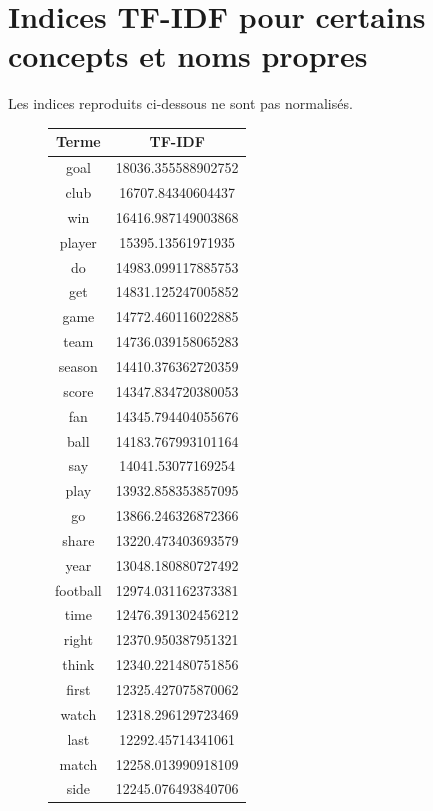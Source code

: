 \documentclass[a4paper, 12pt]{article}
\begin{document}
\nocite{*}
\printbibliography{}

\newpage
\appendix

\section{Indices TF-IDF pour certains concepts et noms propres}

Les indices reproduits ci-dessous ne sont pas normalisés.

\begin{figure}[!h]
\begin{center}
 \begin{tabular}{|c|c|}
 \hline
  \textbf{Terme} & \textbf{TF-IDF} \\
  \hline
  goal & 18036.355588902752 \\
  club & 16707.84340604437 \\
  win & 16416.987149003868 \\
  player & 15395.13561971935 \\
  do & 14983.099117885753 \\
  get & 14831.125247005852 \\
  game & 14772.460116022885 \\
  team & 14736.039158065283 \\
  season & 14410.376362720359 \\
  score & 14347.834720380053 \\
  fan & 14345.794404055676 \\
  ball & 14183.767993101164 \\
  say & 14041.53077169254 \\
  play & 13932.858353857095 \\
  go & 13866.246326872366 \\
  share & 13220.473403693579 \\
  year & 13048.180880727492 \\
  football & 12974.031162373381 \\
  time & 12476.391302456212   \\
  right & 12370.950387951321     \\
  think & 12340.221480751856   \\
  first & 12325.427075870062   \\
  watch & 12318.296129723469   \\
  last & 12292.45714341061   \\
  match & 12258.013990918109   \\
  side & 12245.076493840706   \\

\end{tabular}
\end{center}
\end{figure}
\end{document}
